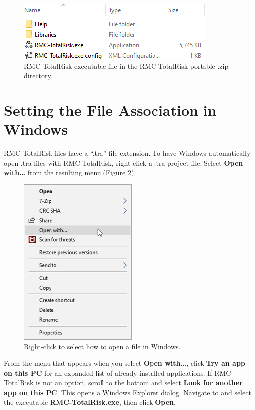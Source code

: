 \documentclass[
]{book}
\begin{document}
\begin{figure}

{\centering \includegraphics{images/figure1} 

}

\caption{RMC-TotalRisk executable file in the RMC-TotalRisk portable .zip directory.}\label{fig:figure-1}
\end{figure}

\hypertarget{setting-the-file-association-in-windows}{%
\section{Setting the File Association in Windows}\label{setting-the-file-association-in-windows}}

RMC-TotalRisk files have a ``.tra'' file extension. To have Windows automatically open .tra files with RMC-TotalRisk, right-click a .tra project file. Select \textbf{Open with\ldots{}} from the resulting menu (Figure \ref{fig:figure-2}).

\begin{figure}

{\centering \includegraphics{images/figure2} 

}

\caption{Right-click to select how to open a file in Windows.}\label{fig:figure-2}
\end{figure}

From the menu that appears when you select \textbf{Open with\ldots{}}, click \textbf{Try an app on this PC} for an expanded list of already installed applications. If RMC-TotalRisk is not an option, scroll to the bottom and select \textbf{Look for another app on this PC}. This opens a Windows Explorer dialog. Navigate to and select the executable \textbf{RMC-TotalRisk.exe}, then click \textbf{Open}.
\end{document}
